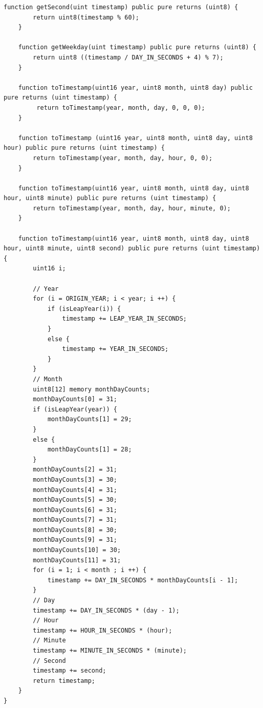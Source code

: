 \documentclass[a4paper]{article}
\begin{document}
\begin{frame}
\begin{lstlisting}[language = Solidity]
    function getSecond(uint timestamp) public pure returns (uint8) {
        return uint8(timestamp % 60);
    }
    
    function getWeekday(uint timestamp) public pure returns (uint8) {
        return uint8 ((timestamp / DAY_IN_SECONDS + 4) % 7);
    }
    
    function toTimestamp(uint16 year, uint8 month, uint8 day) public pure returns (uint timestamp) {
         return toTimestamp(year, month, day, 0, 0, 0);
    }
    
    function toTimestamp (uint16 year, uint8 month, uint8 day, uint8 hour) public pure returns (uint timestamp) {
        return toTimestamp(year, month, day, hour, 0, 0);
    }
    
    function toTimestamp(uint16 year, uint8 month, uint8 day, uint8 hour, uint8 minute) public pure returns (uint timestamp) {
        return toTimestamp(year, month, day, hour, minute, 0);
    }
    
    function toTimestamp(uint16 year, uint8 month, uint8 day, uint8 hour, uint8 minute, uint8 second) public pure returns (uint timestamp) {
        uint16 i;

        // Year
        for (i = ORIGIN_YEAR; i < year; i ++) {
            if (isLeapYear(i)) {
                timestamp += LEAP_YEAR_IN_SECONDS;
            }
            else {
                timestamp += YEAR_IN_SECONDS;
            }
        }
        // Month
        uint8[12] memory monthDayCounts;
        monthDayCounts[0] = 31;
        if (isLeapYear(year)) {
            monthDayCounts[1] = 29;
        }
        else {
            monthDayCounts[1] = 28;
        }
        monthDayCounts[2] = 31;
        monthDayCounts[3] = 30;
        monthDayCounts[4] = 31;
        monthDayCounts[5] = 30;
        monthDayCounts[6] = 31;
        monthDayCounts[7] = 31;
        monthDayCounts[8] = 30;
        monthDayCounts[9] = 31;
        monthDayCounts[10] = 30;
        monthDayCounts[11] = 31;
        for (i = 1; i < month ; i ++) {
            timestamp += DAY_IN_SECONDS * monthDayCounts[i - 1];
        }
        // Day
        timestamp += DAY_IN_SECONDS * (day - 1);
        // Hour
        timestamp += HOUR_IN_SECONDS * (hour);
        // Minute
        timestamp += MINUTE_IN_SECONDS * (minute);
        // Second
        timestamp += second;
        return timestamp;
    }
}
\end{lstlisting}
\end{frame}
\end{document}
